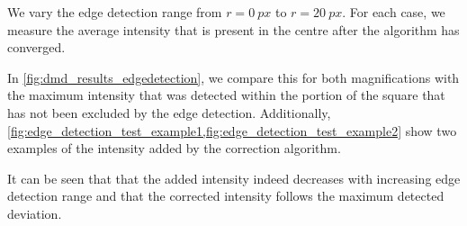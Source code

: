 We vary the edge detection range from $r = \SI{0}{px}$ to $r=\SI{20}{px}$. For each case, we measure the average intensity that is present in the centre after the algorithm has converged. 

In \cref{fig:dmd_results_edgedetection}, we compare this for both magnifications with the maximum intensity that was detected within the portion of the square that has not been excluded by the edge detection. Additionally, \cref{fig:edge_detection_test_example1,fig:edge_detection_test_example2} show two examples of the intensity added by the correction algorithm.

It can be seen that that the added intensity indeed decreases with increasing edge detection range and that the corrected intensity follows the maximum detected deviation.

